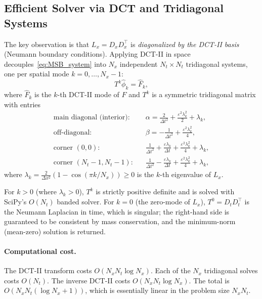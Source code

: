\documentclass[11pt]{article}
\begin{document}
\subsection{Efficient Solver via DCT and Tridiagonal Systems}

The key observation is that $L_x = D_x D_x^\top$ is \emph{diagonalized by
the DCT-II basis} (Neumann boundary conditions).  Applying DCT-II in space
decouples~\eqref{eq:MSB_system} into $N_x$ independent $N_t \times N_t$
tridiagonal systems, one per spatial mode $k = 0, \ldots, N_x - 1$:
\begin{equation}
  T^k \hat\phi_k = \hat F_k,
  \label{eq:tridiag}
\end{equation}
where $\hat F_k$ is the $k$-th DCT-II mode of $F$ and
$T^k$ is a symmetric tridiagonal matrix with entries
\begin{align}
  \text{main diagonal (interior):} &\quad
    \alpha = \frac{2}{\Delta t^2} + \frac{\varepsilon^2 \lambda_k^2}{2} + \lambda_k,\\
  \text{off-diagonal:} &\quad
    \beta  = -\frac{1}{\Delta t^2} + \frac{\varepsilon^2 \lambda_k^2}{4},\\
  \text{corner $(0,0)$:} &\quad
    \frac{1}{\Delta t^2} + \frac{\varepsilon\lambda_k}{\Delta t}
    + \frac{\varepsilon^2\lambda_k^2}{4} + \lambda_k,\\
  \text{corner $(N_t{-}1, N_t{-}1)$:} &\quad
    \frac{1}{\Delta t^2} - \frac{\varepsilon\lambda_k}{\Delta t}
    + \frac{\varepsilon^2\lambda_k^2}{4} + \lambda_k,
\end{align}
where $\lambda_k = \frac{2}{\Delta x^2}(1 - \cos(\pi k/N_x)) \geq 0$ is
the $k$-th eigenvalue of $L_x$.

For $k > 0$ (where $\lambda_k > 0$), $T^k$ is strictly positive definite
and is solved with SciPy's $O(N_t)$ banded solver.  For $k = 0$
(the zero-mode of $L_x$), $T^0 = D_t D_t^\top$ is the Neumann Laplacian
in time, which is singular; the right-hand side is guaranteed to be
consistent by mass conservation, and the minimum-norm (mean-zero) solution
is returned.

\paragraph{Computational cost.}
The DCT-II transform costs $O(N_x N_t \log N_x)$.  Each of the $N_x$
tridiagonal solves costs $O(N_t)$.  The inverse DCT-II costs
$O(N_x N_t \log N_x)$.  The total is
$O(N_x N_t (\log N_x + 1))$, which is essentially linear in the problem
size $N_x N_t$.
\end{document}
